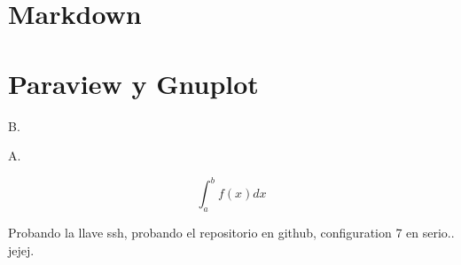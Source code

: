 \documentclass[10pt,
	a4paper,
	spanish,
	titlepage=firstiscover,
	titlepage=true,
	BCOR=2cm,
	DIV=12
]{scrbook}
\begin{document}
\begin{refsection}
	\section{Markdown}
	
	\section{Paraview y Gnuplot}
	
	
	

	
	B.\cite{Reilly}

	\printbibliography[
	title={Referencias},
	heading=bibintoc]
	\nocite{*}
	\printbibliography[
	title={Bibliografía},
	heading=none,keyword=paper]
\end{refsection}

A.

$$\int_a^b f(x)dx$$

Probando la llave ssh, probando el repositorio en github, configuration 7 en serio.. jejej.

\printindex
\end{document}
